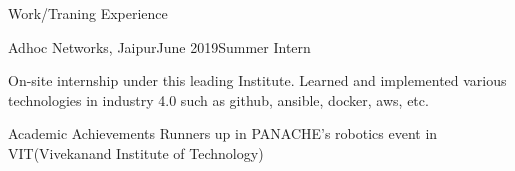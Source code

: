 \documentclass{resume} %
\begin{document}

\begin{rSection}{Work/Traning Experience}

\begin{rSubsection}{Adhoc Networks, Jaipur}{June 2019}{Summer Intern}{}
\item On-site internship under this leading Institute. Learned and implemented various technologies in industry 4.0 such as github, ansible, docker, aws, etc.
\end{rSubsection}


\end{rSection}



\begin{rSection}{Academic Achievements} 
 Runners up in PANACHE's robotics event in VIT(Vivekanand Institute of Technology)
\end{rSection}

\end{document}
